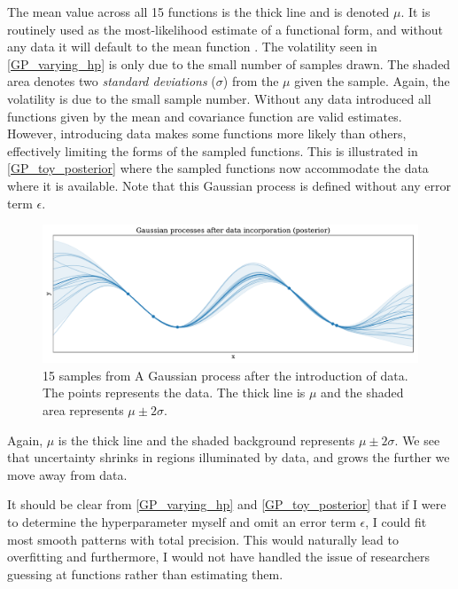 \documentclass[a4paper]{article}
\begin{document}
The mean value across all 15 functions is the thick line and is denoted $\mu$. It is routinely used as the most-likelihood estimate of a functional form, and without any data it will default to the mean function \cite[3]{williams2006gaussian}. The volatility seen in \autoref{GP_varying_hp} is only due to the small number of samples drawn. The shaded area denotes two \emph{standard deviations} ($\sigma$) from the $\mu$ given the sample. Again, the volatility is due to the small sample number. Without any data introduced all functions given by the mean and covariance function are valid estimates. However, introducing data makes some functions more likely than others, effectively limiting the forms of the sampled functions. This is illustrated in \autoref{GP_toy_posterior} where the sampled functions now accommodate the data where it is available. Note that this Gaussian process is defined without any error term $\epsilon$.\par  

\begin{figure}[!htb]
	\centering
	\includegraphics[scale=0.47]{GP_toy_posterior.pdf}
    \caption{\footnotesize{15 samples from A Gaussian process after the introduction of data. The points represents the data. The thick line is $\mu$ and the shaded area represents $\mu \pm 2\sigma$.}}\label{GP_toy_posterior}
\end{figure}

Again, $\mu$ is the thick line and the shaded background represents $\mu \pm 2\sigma$. We see that uncertainty shrinks in regions illuminated by data, and grows the further we move away from data.\par

It should be clear from \autoref{GP_varying_hp} and \autoref{GP_toy_posterior} that if I were to determine the hyperparameter myself and omit an error term $\epsilon$, I could fit most smooth patterns with total precision. This would naturally lead to overfitting and furthermore, I would not have handled the issue of researchers guessing at functions rather than estimating them.\par
\end{document}

